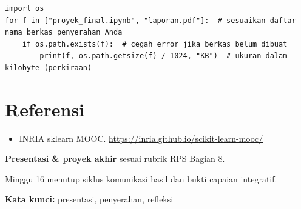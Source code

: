 \documentclass[../main.tex]{subfiles}
\begin{document}
\begin{lstlisting}[caption=Cek ukuran berkas sebelum unggah]
import os
for f in ["proyek_final.ipynb", "laporan.pdf"]:  # sesuaikan daftar nama berkas penyerahan Anda
    if os.path.exists(f):  # cegah error jika berkas belum dibuat
        print(f, os.path.getsize(f) / 1024, "KB")  # ukuran dalam kilobyte (perkiraan)
\end{lstlisting}

\section{Referensi}

\begin{itemize}[leftmargin=*]
  \item INRIA sklearn MOOC. \url{https://inria.github.io/scikit-learn-mooc/}
\end{itemize}

\begin{asesmen}
\textbf{Presentasi \& proyek akhir} sesuai rubrik RPS Bagian 8.
\end{asesmen}

\begin{rangkuman}
Minggu 16 menutup siklus komunikasi hasil dan bukti capaian integratif.

\textbf{Kata kunci:} presentasi, penyerahan, refleksi
\end{rangkuman}
\end{document}
